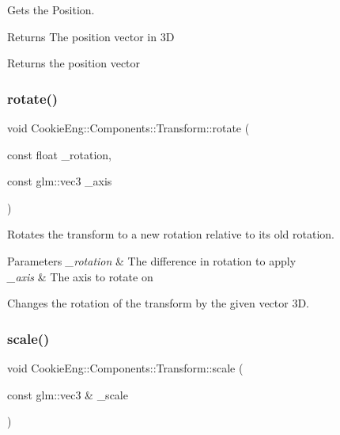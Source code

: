 Gets the Position. 

\begin{DoxyReturn}{Returns}
The position vector in 3D
\end{DoxyReturn}
Returns the position vector \mbox{\label{class_cookie_eng_1_1_components_1_1_transform_a061b3b2b5d33c1dda2955e9b2e01d736}} 
\subsubsection{\texorpdfstring{rotate()}{rotate()}}
{\footnotesize\ttfamily void Cookie\+Eng\+::\+Components\+::\+Transform\+::rotate (\begin{DoxyParamCaption}\item[{const float}]{\+\_\+rotation,  }\item[{const glm\+::vec3}]{\+\_\+axis }\end{DoxyParamCaption})}



Rotates the transform to a new rotation relative to its old rotation. 


\begin{DoxyParams}{Parameters}
{\em \+\_\+rotation} & The difference in rotation to apply \\
\hline
{\em \+\_\+axis} & The axis to rotate on\\
\hline
\end{DoxyParams}
Changes the rotation of the transform by the given vector 3D. \mbox{\label{class_cookie_eng_1_1_components_1_1_transform_abfb2568bd0222d8687593d253688f99f}} 
\subsubsection{\texorpdfstring{scale()}{scale()}}
{\footnotesize\ttfamily void Cookie\+Eng\+::\+Components\+::\+Transform\+::scale (\begin{DoxyParamCaption}\item[{const glm\+::vec3 \&}]{\+\_\+scale }\end{DoxyParamCaption})}



